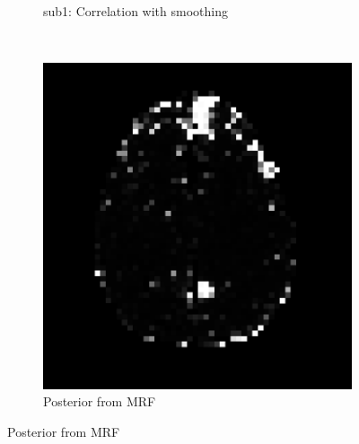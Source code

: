 \begin{figure}[p]
\begin{subfigure}[t]{0.3\textwidth}
    \caption{sub1: Correlation with smoothing}
    \label{fig:invivo22}
    \end{subfigure}
~
  \begin{subfigure}[t]{0.3\textwidth}
    \centering
    \includegraphics[width=\textwidth]{figures/method1/invivo2/R1_mrf}
    \caption{Posterior from MRF}
    \label{fig:invivo23}
    \end{subfigure}


\end{figure}
